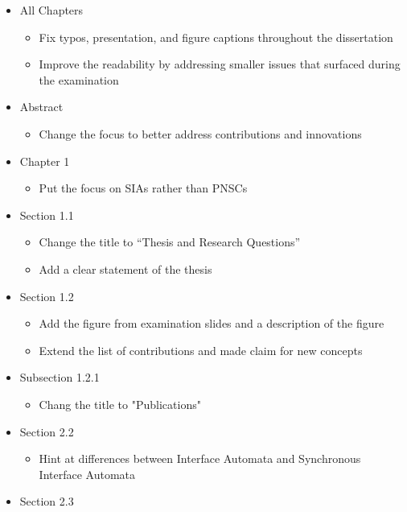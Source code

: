 \documentclass{article}
\begin{document}
\begin{itemize}
    \item All Chapters
        \begin{itemize}
            \item Fix typos, presentation, and figure captions throughout the dissertation
            \item Improve the readability by addressing smaller issues that surfaced during the examination
        \end{itemize}
    \item Abstract
        \begin{itemize}
            \item Change the focus to better address contributions and innovations
        \end{itemize}
    \item Chapter 1
        \begin{itemize}
            \item Put the focus on SIAs rather than PNSCs
        \end{itemize}
    \item Section 1.1
        \begin{itemize}
            \item Change the title to ``Thesis and Research Questions''
            \item Add a clear statement of the thesis
        \end{itemize}
    \item Section 1.2
        \begin{itemize}
            \item Add the figure from examination slides and a description of the figure
            \item Extend the list of contributions and made claim for new concepts
        \end{itemize}
    \item Subsection 1.2.1
        \begin{itemize}
            \item Chang the title to "Publications"
        \end{itemize}
    \item Section 2.2
        \begin{itemize}
            \item Hint at differences between Interface Automata and Synchronous Interface Automata
        \end{itemize}
    \item Section 2.3

\end{itemize}
\end{document}
